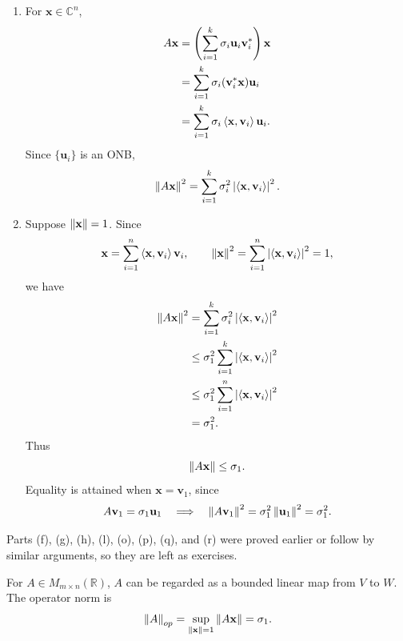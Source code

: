 \begin{pfbox}
\begin{enumerate}
    \item[(m)]
    For $\mathbf{x}\in\mathbb{C}^n$,
    \begin{align*}
    A\mathbf{x}
    &=
    \left(\sum_{i=1}^k \sigma_i\mathbf{u}_i\mathbf{v}_i^*\right)\mathbf{x} \\
    &=
    \sum_{i=1}^k
    \sigma_i(\mathbf{v}_i^*\mathbf{x})\mathbf{u}_i \\
    &=
    \sum_{i=1}^k
    \sigma_i\left\langle \mathbf{x}, \mathbf{v}_i \right\rangle\mathbf{u}_i.
    \end{align*}
    Since $\{\mathbf{u}_i\}$ is an ONB,
    \[
    \left\lVert A\mathbf{x} \right\rVert^2
    =
    \sum_{i=1}^k
    \sigma_i^2
    \left\lvert \left\langle \mathbf{x}, \mathbf{v}_i \right\rangle \right\rvert^2.
    \]

    \item[(n)]
    Suppose $\left\lVert \mathbf{x} \right\rVert=1$. Since
    \[
    \mathbf{x}
    =
    \sum_{i=1}^n
    \left\langle \mathbf{x}, \mathbf{v}_i \right\rangle\mathbf{v}_i,
    \qquad
    \left\lVert \mathbf{x} \right\rVert^2
    =
    \sum_{i=1}^n
    \left\lvert \left\langle \mathbf{x}, \mathbf{v}_i \right\rangle \right\rvert^2
    =
    1,
    \]
    we have
    \begin{align*}
    \left\lVert A\mathbf{x} \right\rVert^2
    &=
    \sum_{i=1}^k
    \sigma_i^2
    \left\lvert \left\langle \mathbf{x}, \mathbf{v}_i \right\rangle \right\rvert^2 \\
    &\le
    \sigma_1^2
    \sum_{i=1}^k
    \left\lvert \left\langle \mathbf{x}, \mathbf{v}_i \right\rangle \right\rvert^2 \\
    &\le
    \sigma_1^2
    \sum_{i=1}^n
    \left\lvert \left\langle \mathbf{x}, \mathbf{v}_i \right\rangle \right\rvert^2 \\
    &=
    \sigma_1^2.
    \end{align*}
    Thus
    \[
    \left\lVert A\mathbf{x} \right\rVert\le \sigma_1.
    \]
    Equality is attained when $\mathbf{x}=\mathbf{v}_1$, since
    \[
    A\mathbf{v}_1=\sigma_1\mathbf{u}_1
    \quad\Longrightarrow\quad
    \left\lVert A\mathbf{v}_1 \right\rVert^2
    =
    \sigma_1^2\left\lVert \mathbf{u}_1 \right\rVert^2
    =
    \sigma_1^2.
    \]
\end{enumerate}

Parts (f), (g), (h), (l), (o), (p), (q), and (r) were proved earlier or follow by similar arguments, so they are left as exercises.
\end{pfbox}



\begin{remark}
For $A\in M_{m\times n}(\mathbb{R})$, $A$ can be regarded as a bounded linear map from $V$ to $W$. The operator norm is
\[
\left\lVert A \right\rVert_{op}
=
\sup_{\left\lVert \mathbf{x} \right\rVert=1}\left\lVert A\mathbf{x} \right\rVert
=
\sigma_1.
\]
\end{remark}